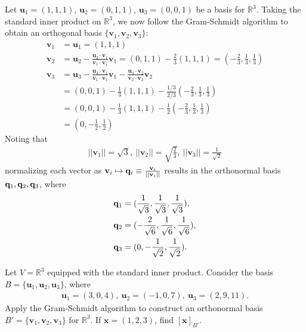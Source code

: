 \documentclass[12pt,letterpaper,reqno]{article}
\numberwithin{equation}{section}
\newcommand{\bv}{\mathbf{v}}
\newcommand{\bu}{\mathbf{u}}
\newcommand{\bx}{\mathbf{x}}
\begin{document}
\begin{example}
	Let $\bu_1=(1,1,1)$, $\bu_2=(0,1,1)$, $\bu_3=(0,0,1)$ be a basis for $\mathbb{R}^3$. Taking the standard inner product on $\mathbb{R}^3$, we now follow the Gram-Schmidt algorithm to obtain an orthogonal basis $\{\bv_1,\bv_2,\bv_3\}$:
	\begin{align*}
		\bv_1&=\bu_1=(1,1,1) \\
		\bv_2&=\bu_2-\frac{\bu_2 \cdot \bv_1}{\bv_1 \cdot \bv_1}\bv_1=(0,1,1)-\frac{2}{3}(1,1,1)=(-\frac{2}{3},\frac{1}{3},\frac{1}{3}) \\
		\bv_3&=\bu_3-\frac{\bu_3 \cdot \bv_1}{\bv_1 \cdot \bv_1}\bv_1-\frac{\bu_3 \cdot \bv_2}{\bv_2 \cdot \bv_2}\bv_2 \\
		&=(0,0,1)-\frac{1}{3}(1,1,1)-\frac{1/3}{2/3}(-\frac{2}{3},\frac{1}{3},\frac{1}{3}) \\
		&=(0,0,1)-\frac{1}{3}(1,1,1)-\frac{1}{2}(-\frac{2}{3},\frac{1}{3},\frac{1}{3}) \\
		&=(0,-\frac{1}{2},\frac{1}{2})
	\end{align*} 
	Noting that 
	\begin{align*}
		||\bv_1||=\sqrt{3}, \ ||\bv_2||=\sqrt{\frac{2}{3}}, \ ||\bv_3||=\frac{1}{\sqrt{2}}
	\end{align*}
	normalizing each vector as $\bv_i \mapsto {\bf q}_i\equiv \frac{\bv_i}{||\bv_i||}$ results in the orthonormal basis ${\bf q}_1, {\bf q}_2, {\bf q}_3$, where
	\begin{align*}
	{\bf q}_1&=(\frac{1}{\sqrt{3}}, \frac{1}{\sqrt{3}}, \frac{1}{\sqrt{3}}), \\
	 {\bf q}_2&=(-\frac{2}{\sqrt{6}},\frac{1}{\sqrt{6}},\frac{1}{\sqrt{6}}), \\
	 {\bf q}_3&=(0,-\frac{1}{\sqrt{2}},\frac{1}{\sqrt{2}}). \\	
	\end{align*} 
\end{example}

\begin{exercise}
	Let $V=\mathbb{R}^3$ equipped with the standard inner product. Consider the basis $B=\{\bu_1,\bu_2,\bu_3\}$, where 
	\begin{align*}
		\bu_1=(3,0,4), \ \bu_2=(-1,0,7), \ \bu_3=(2,9,11).
	\end{align*}
	Apply the Gram-Schmidt algorithm to construct an orthonormal basis $B'=\{\bv_1,\bv_2,\bv_3\}$ for $\mathbb{R}^3$. If $\bx=(1,2,3)$, find $[\bx]_{B'}$.
\end{exercise}
\end{document}
